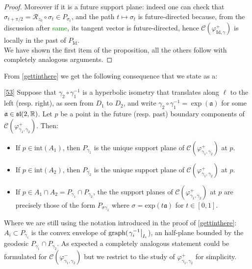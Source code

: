 \begin{proof}
    Moreover if it is a future support plane: indeed one can check that $\sigma_{t+\pi/2}=\mathcal{R}_{z_0}\circ\sigma_t\in P_{\sigma_t}$, and the path $t\mapsto\sigma_t$ is future-directed because, from the discussion after \textcolor{green}{same}, its tangent vector is future-directed, hence $\mathcal{C}(\varphi_{\text{Id},\gamma}^+)$ is locally in the past of $P_{\text{Id}}$. \\
    We have shown the first item of the proposition, all the others follow with completely analogous arguments.
\end{proof}



From \ref{gettinthere} we get the following consequence that we state as a:

\begin{corollary}\ref{53}
    Suppose that $\gamma_2\circ\gamma_1^{-1}$ is a hyperbolic isometry that translates along $\ell$ to the left (resp. right), as seen from $D_1$ to $D_2$, and write $\gamma_2\circ\gamma_1^{-1}=\exp(\mathfrak{a})$ for some $\mathfrak{a}\in\mathfrak{sl}(2,\mathbb{R})$. Let $p$ be a point in the future (resp. past) boundary components of $\mathcal{C}(\varphi_{\gamma_1,\gamma_2}^{+}).$ Then:
    \begin{itemize}
        \item If $p\in\text{int}(A_1)$, then $P_{\gamma_1}$ is the unique support plane of $\mathcal{C}(\varphi_{\gamma_1,\gamma_2}^{+})$ at $p$. 
        \item If $p\in\text{int}(A_2)$, then $P_{\gamma_2}$ is the unique support plane of $\mathcal{C}(\varphi_{\gamma_1,\gamma_2}^{+})$ at $p$. 
        \item If $p\in A_1\cap A_2= P_{\gamma_1}\cap P_{\gamma_2}$, the the support planes of $\mathcal{C}(\varphi_{\gamma_1,\gamma_2}^{+})$ at $p$ are precisely those of the form $P_{\sigma\gamma_1}$ where $\sigma=\text{exp}(t\mathfrak{a})$ for $t\in [0,1].$  
    \end{itemize}

    
\end{corollary}

Where we are still using the notation introduced in the proof of \ref{gettinthere}: $A_i\subset P_{\gamma_i}$ is the convex envelope of $\text{graph}(\left.\gamma_i^{-1}\right|_{I_i}$), an half-plane bounded by the geodesic $P_{\gamma_1}\cap P_{\gamma_2}.$ As expected a completely analogous statement could be formulated for $\mathcal{C}(\varphi_{\gamma_1,\gamma_2}^{-})$ but we restrict to the study of $\varphi_{\gamma_1,\gamma_2}^{+}$ for simplicity. 

